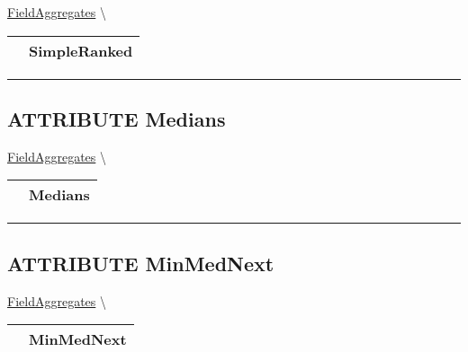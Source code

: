 \hypertarget{ecldoc:ml_core.fieldaggregates.simpleranked}{}
\hspace{0pt} \hyperlink{ecldoc:ml_core.fieldaggregates}{FieldAggregates} \textbackslash 

{\renewcommand{\arraystretch}{1.5}
\begin{tabularx}{\textwidth}{|>{\raggedright\arraybackslash}l|X|}
\hline
\hspace{0pt}\mytexttt{\color{red} } & \textbf{SimpleRanked} \\
\hline
\end{tabularx}
}

\par


\rule{\linewidth}{0.5pt}
\subsection*{\textsf{\colorbox{headtoc}{\color{white} ATTRIBUTE}
Medians}}

\hypertarget{ecldoc:ml_core.fieldaggregates.medians}{}
\hspace{0pt} \hyperlink{ecldoc:ml_core.fieldaggregates}{FieldAggregates} \textbackslash 

{\renewcommand{\arraystretch}{1.5}
\begin{tabularx}{\textwidth}{|>{\raggedright\arraybackslash}l|X|}
\hline
\hspace{0pt}\mytexttt{\color{red} } & \textbf{Medians} \\
\hline
\end{tabularx}
}

\par


\rule{\linewidth}{0.5pt}
\subsection*{\textsf{\colorbox{headtoc}{\color{white} ATTRIBUTE}
MinMedNext}}

\hypertarget{ecldoc:ml_core.fieldaggregates.minmednext}{}
\hspace{0pt} \hyperlink{ecldoc:ml_core.fieldaggregates}{FieldAggregates} \textbackslash 

{\renewcommand{\arraystretch}{1.5}
\begin{tabularx}{\textwidth}{|>{\raggedright\arraybackslash}l|X|}
\hline
\hspace{0pt}\mytexttt{\color{red} } & \textbf{MinMedNext} \\
\hline
\end{tabularx}
}

